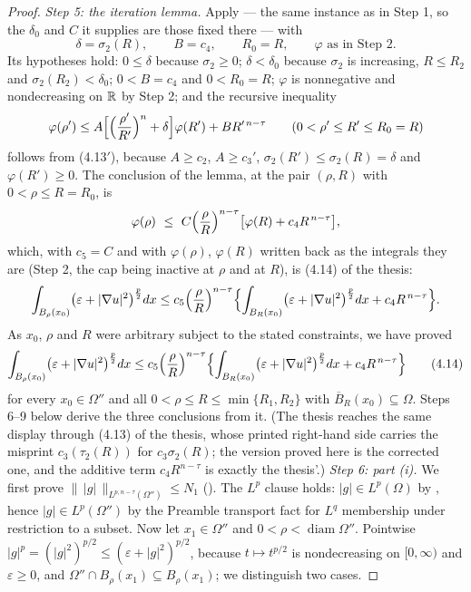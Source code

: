 \begin{proof}
\emph{Step 5: the iteration lemma.}  Apply  ---
the same instance as in Step 1, so the $\delta_0$ and $C$ it supplies are those
fixed there --- with
\[
\delta=\sigma_2(R),\qquad B=c_4,\qquad R_0=R,\qquad \varphi \text{ as in Step 2}.
\]
Its hypotheses hold: $0\le\delta$ because $\sigma_2\ge0$; $\delta<\delta_0$
because $\sigma_2$ is increasing, $R\le R_2$ and $\sigma_2(R_2)<\delta_0$;
$0<B=c_4$ and $0<R_0=R$; $\varphi$ is nonnegative and nondecreasing on $\mathbb{R}$ by
Step 2; and the recursive inequality
\[
\varphi(\rho')\le A\Bigl[\Bigl(\frac{\rho'}{R'}\Bigr)^{n}+\delta\Bigr]\varphi(R')
+BR'^{\,n-\tau}
\qquad(0<\rho'\le R'\le R_0=R)
\]
follows from (4.13$'$), because $A\ge c_2$, $A\ge c_3'$,
$\sigma_2(R')\le\sigma_2(R)=\delta$ and $\varphi(R')\ge0$.  The conclusion of the
lemma, at the pair $(\rho,R)$ with $0<\rho\le R=R_0$, is
\[
\varphi(\rho)\ \le\ C\Bigl(\frac\rho R\Bigr)^{n-\tau}
\bigl[\varphi(R)+c_4R^{\,n-\tau}\bigr],
\]
which, with $c_5=C$ and with $\varphi(\rho)$, $\varphi(R)$ written back as the
integrals they are (Step 2, the cap being inactive at $\rho$ and at $R$), is
(4.14) of the thesis:
\[
\int_{B_\rho(x_0)}\bigl(\varepsilon+|\nabla u|^2\bigr)^{\frac p2}dx
\le c_5\Bigl(\frac\rho R\Bigr)^{n-\tau}
\Bigl\{\int_{B_R(x_0)}\bigl(\varepsilon+|\nabla u|^2\bigr)^{\frac p2}dx
+c_4R^{\,n-\tau}\Bigr\}.
\]
As $x_0$, $\rho$ and $R$ were arbitrary subject to the stated constraints, we
have proved
\[
\int_{B_\rho(x_0)}\bigl(\varepsilon+|\nabla u|^2\bigr)^{\frac p2}dx
\le c_5\Bigl(\frac\rho R\Bigr)^{n-\tau}
\Bigl\{\int_{B_R(x_0)}\bigl(\varepsilon+|\nabla u|^2\bigr)^{\frac p2}dx
+c_4R^{\,n-\tau}\Bigr\}
\tag{4.14}
\]
for every $x_0\in\Omega''$ and all $0<\rho\le R\le\min\{R_1,R_2\}$ with
$\overline B_R(x_0)\subseteq\Omega$.  Steps 6--9 below derive the three
conclusions from it.  (The thesis reaches the same display through
(4.13) of the thesis, whose printed right-hand side carries the misprint
$c_3(\tau_2(R))$ for $c_3\sigma_2(R)$; the version proved here is the corrected
one, and the additive term $c_4R^{n-\tau}$ is exactly the thesis'.)
\emph{Step 6: part (i).}  We first prove
$\|\,|g|\,\|_{L^{p,n-\tau}(\Omega'')}\le N_1$
().  The $L^p$ clause holds: $|g|\in L^p(\Omega)$ by
, hence $|g|\in L^p(\Omega'')$ by the Preamble
transport fact for $L^q$ membership under restriction to a subset.  Now let
$x_1\in\Omega''$ and $0<\rho<\operatorname{diam}\Omega''$.
Pointwise $|g|^p=(|g|^2)^{p/2}\le(\varepsilon+|g|^2)^{p/2}$, because
$t\mapsto t^{p/2}$ is nondecreasing on $[0,\infty)$ and $\varepsilon\ge0$, and
$\Omega''\cap B_\rho(x_1)\subseteq B_\rho(x_1)$; we distinguish two
cases.


\end{proof}
